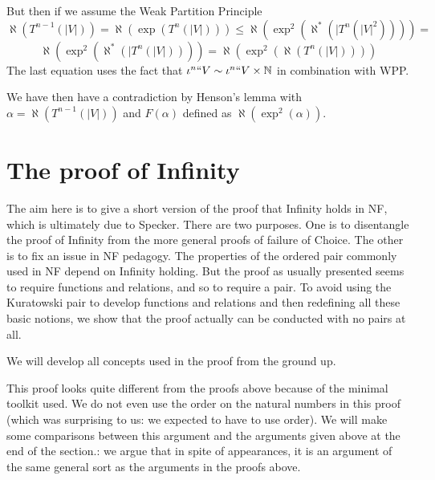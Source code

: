 \documentclass[12pt]{article}
\begin{document}
But then if we assume the Weak Partition Principle $$\aleph(T^{n-1}(|V|)) = \aleph(\exp(T^n(|V|))) \leq \aleph(\exp^2(\aleph^*(|T^n(|V|^2)))) = $$ $$\aleph(\exp^2(\aleph^*(|T^n(|V|)))) = \aleph(\exp^2(\aleph(T^n(|V|))))$$
The last equation uses the fact that $\iota^n``V \sim \iota^n``V \times \mathbb N$ in combination with WPP.

We have then have a contradiction by Henson's lemma  with $\alpha = \aleph(T^{n-1}(|V|))$ and $F(\alpha)$ defined as $\aleph(\exp^2(\alpha))$.   

\section{The proof of Infinity}

The aim here is to give a short version of the proof that Infinity holds in NF, which is ultimately due to Specker.
There are two purposes.  One is to disentangle the proof of Infinity from the more general proofs of failure of Choice.
The other is to fix an issue in NF pedagogy.  The properties of the ordered pair commonly used in NF depend on Infinity holding.  But the proof as usually presented seems to require functions and relations, and so to require a pair.  To avoid using the Kuratowski pair to develop functions and relations and then redefining all these basic notions, we show that the proof actually can be conducted with no pairs at all.

We will develop all concepts used in the proof from the ground up.

This proof looks quite different from the proofs above because of the minimal toolkit used.  We do not even use the order on the natural numbers in this proof (which was surprising to us:  we expected to have to use order).  We will make some comparisons between this argument and the arguments given above at the end of the section.:  we argue that in spite of appearances, it is an argument of the same general sort as the arguments in the proofs above.
\end{document}
